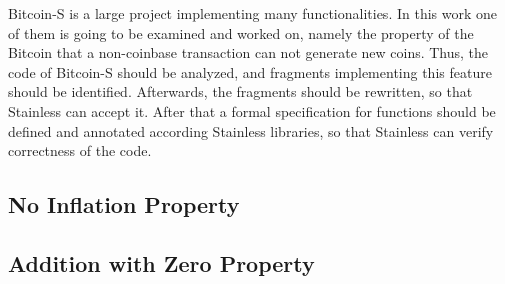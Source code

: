 Bitcoin-S is a large project implementing many functionalities.
In this work one of them is going to be examined and worked on, namely the property of the Bitcoin that a non-coinbase transaction can not generate new coins.
Thus, the code of Bitcoin-S should be analyzed, and fragments implementing this feature should be identified.
Afterwards, the fragments should be rewritten, so that Stainless can accept it.
After that a formal specification for functions should be defined and annotated according Stainless libraries, so that Stainless can verify correctness of the code.


\subsection{No Inflation Property}



\subsection{Addition with Zero Property}


